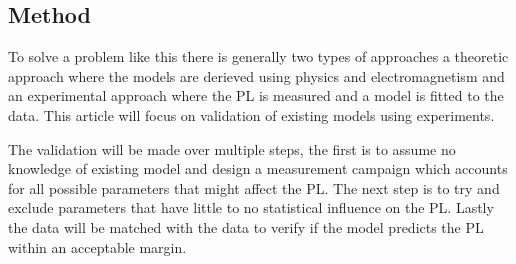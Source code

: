\subsection{Method}
To solve a problem like this there is generally two types of approaches a theoretic approach where the models are derieved using physics and electromagnetism and an experimental approach where the PL is measured and a model is fitted to the data. This article will focus on validation of existing models using experiments. 

The validation will be made over multiple steps, the first is to assume no knowledge of existing model and design a measurement campaign which accounts for all possible parameters that might affect the PL. The next step is to try and exclude parameters that have little to no statistical influence on the PL. Lastly the data will be matched with the data to verify if the model predicts the PL within an acceptable margin.  